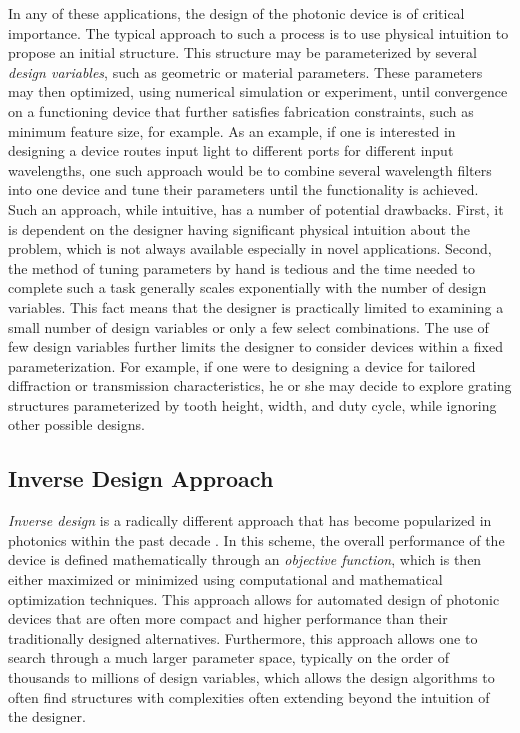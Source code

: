 In any of these applications, the design of the photonic device is of critical importance.
The typical approach to such a process is to use physical intuition to propose an initial structure.
This structure may be parameterized by several \textit{design variables}, such as geometric or material parameters.
These parameters may then optimized, using numerical simulation or experiment, until convergence on a functioning device that further satisfies fabrication constraints, such as minimum feature size, for example.
As an example, if one is interested in designing a device routes input light to different ports for different input wavelengths, one such approach would be to combine several wavelength filters into one device and tune their parameters until the functionality is achieved.
Such an approach, while intuitive, has a number of potential drawbacks.
First, it is dependent on the designer having significant physical intuition about the problem, which is not always available especially in novel applications.
Second, the method of tuning parameters by hand is tedious and the time needed to complete such a task generally scales exponentially with the number of design variables.
This fact means that the designer is practically limited to examining a small number of design variables or only a few select combinations.
The use of few design variables further limits the designer to consider devices within a fixed parameterization.
For example, if one were to designing a device for tailored diffraction or transmission characteristics, he or she may decide to explore grating structures parameterized by tooth height, width, and duty cycle, while ignoring other possible designs.

\subsection{Inverse Design Approach}

\textit{Inverse design} is a radically different approach that has become popularized in photonics within the past decade \cite{molesky_inverse_2018}.  
In this scheme, the overall performance of the device is defined mathematically through an \textit{objective function}, which is then either maximized or minimized using computational and mathematical optimization techniques.
This approach allows for automated design of photonic devices that are often more compact and higher performance than their traditionally designed alternatives.
Furthermore, this approach allows one to search through a much larger parameter space, typically on the order of thousands to millions of design variables, which allows the design algorithms to often find structures with complexities often extending beyond the intuition of the designer.

